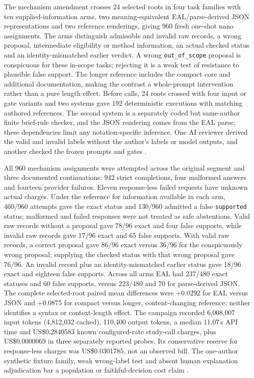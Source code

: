 \documentclass[preprint,12pt]{elsarticle}
\begin{document}
The mechanism amendment crosses 24 selected roots in four task families with ten supplied-information arms, two meaning-equivalent EAL/parse-derived JSON representations and two reference renderings, giving 960 fresh one-shot nano assignments. The arms distinguish admissible and invalid raw records, a wrong proposal, intermediate eligibility or method information, an actual checked status and an identity-mismatched earlier verdict. A wrong \texttt{out\_of\_scope} proposal is conspicuous for these in-scope tasks; rejecting it is a weak test of resistance to plausible false support. The longer reference includes the compact core and additional documentation, making the contrast a whole-prompt intervention rather than a pure length effect. Before calls, 24 roots crossed with four input or gate variants and two systems gave 192 deterministic executions with matching authored references. The second system is a separately coded but same-author finite brief-rule checker, and the JSON rendering comes from the EAL parse; these dependencies limit any notation-specific inference. One AI reviewer derived the valid and invalid labels without the author's labels or model outputs, and another checked the frozen prompts and gates \citep{earlThreeStudyMethods}.

All 960 mechanism assignments were attempted across the original segment and three documented continuations: 942 strict completions, four malformed answers and fourteen provider failures. Eleven response-less failed requests have unknown actual charges. Under the reference for information available in each arm, 460/960 attempts gave the exact status and 130/960 admitted a false \texttt{supported} status; malformed and failed responses were not treated as safe abstentions. Valid raw records without a proposal gave 78/96 exact and four false supports, while invalid raw records gave 17/96 exact and 65 false supports. With valid raw records, a correct proposal gave 86/96 exact versus 36/96 for the conspicuously wrong proposal; supplying the checked status with that wrong proposal gave 76/96. An invalid record plus an identity-mismatched earlier status gave 18/96 exact and eighteen false supports. Across all arms EAL had 237/480 exact statuses and 60 false supports, versus 223/480 and 70 for parse-derived JSON. The complete selected-root paired mean differences were +0.0292 for EAL versus JSON and +0.0875 for compact versus longer, content-changing reference; neither identifies a syntax or context-length effect. The campaign recorded 6,008,007 input tokens (4,812,032 cached), 110,400 output tokens, a median 11.07\,s API time and US\$0.2840583 known configured-rate study-call charges, plus US\$0.0000069 in three separately reported probes. Its conservative reserve for response-less charges was US\$0.0301785, not an observed bill. The one-author synthetic fixture family, weak wrong-label test and absent human explanation adjudication bar a population or faithful-decision cost claim \citep{earlMechanisms960}.
\end{document}
